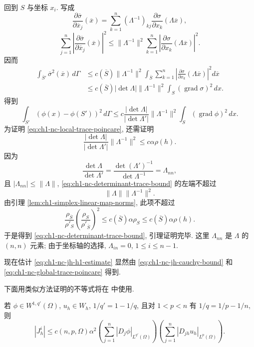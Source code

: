 \begin{Proof}
回到 $S$ 与坐标 $x_i$. 写成
\[
\frac{\partial\overline\sigma}{\partial\overline x_j}(\overline x)
=\sum_{k=1}^n(\Lambda^{-1})_{kj}
\frac{\partial\sigma}{\partial x_k}(\Lambda\overline x),
\]
\[
\sum_{j=1}^n\left|\frac{\partial\overline\sigma}{\partial\overline x_j}(\overline x)\right|^2
\leq\|\Lambda^{-1}\|^2\sum_{k=1}^n
\left|\frac{\partial\sigma}{\partial x_k}(\Lambda\overline x)\right|^2.
\]
因而
\[
\begin{aligned}
\int_{\overline S'}\overline\sigma^2(\overline x)\,d\Gamma
&\leq c(\overline S)\|\Lambda^{-1}\|^2
\int_{\overline S}\sum_{k=1}^n
\left|\frac{\partial\sigma}{\partial x_k}(\Lambda\overline x)\right|^2d\overline x\\
&\leq c(\overline S)|\det\Lambda|\|\Lambda^{-1}\|^2
\int_S(\operatorname{grad}\sigma)^2\,dx.
\end{aligned}
\]
得到
\[
\int_{S'}(\phi(x)-\phi(S'))^2\,d\Gamma
\leq c\frac{|\det\Lambda|}{|\det\Lambda'|}
\|\Lambda^{-1}\|^2\int_S(\operatorname{grad}\phi)^2\,dx.
\]
为证明 \eqref{eq:ch1-nc-local-trace-poincare}, 还需证明
\begin{equation}
\frac{|\det\Lambda|}{|\det\Lambda'|}
\|\Lambda^{-1}\|^2\leq c\alpha\rho(h).
\label{eq:ch1-nc-determinant-trace-bound}
\end{equation}
因为
\[
\frac{\det\Lambda}{\det\Lambda'}
=\frac{\det(\Lambda')^{-1}}{\det\Lambda^{-1}}
=\Lambda_{nn},
\]
且 $|\Lambda_{nn}|\leq\|\Lambda\|$, \eqref{eq:ch1-nc-determinant-trace-bound} 的左端不超过
\[
\|\Lambda\|\|\Lambda^{-1}\|^2.
\]
由引理 \ref{lem:ch1-simplex-linear-map-norms}, 此项不超过
\[
\frac{\rho_{\overline S}}{\rho'_S}
\left(\frac{\rho_S}{\rho'_{\overline S}}\right)^2
\leq c(\overline S)\alpha\rho_S
\leq c(\overline S)\alpha\rho(h).
\]
于是得到 \eqref{eq:ch1-nc-determinant-trace-bound}, 引理证明完毕. 这里 $\Lambda_{nn}$ 是 $\Lambda$ 的 $(n,n)$ 元素; 由于坐标轴的选择, $\Lambda_{in}=0$, $1\leq i\leq n-1$.
\end{Proof}

现在估计 \eqref{eq:ch1-nc-jh-h1-estimate} 显然由 \eqref{eq:ch1-nc-jh-cauchy-bound} 和 \eqref{eq:ch1-nc-global-trace-poincare} 得到.

下面用类似方法证明的不等式将在  中使用.

\begin{Proposition}
\label{prop:ch1-nc-jh-lp-estimate}
若 $\phi\in W^{1,q'}(\Omega)$, $u_h\in W_h$, $1/q'=1-1/q$, 且对 $1<p<n$ 有 $1/q=1/p-1/n$, 则
\begin{equation}
|J_h^i|\leq c(n,p,\Omega)\alpha^2
\left(\sum_{j=1}^n|D_j\phi|_{L^{q'}(\Omega)}\right)
\left(\sum_{j=1}^n|D_{jh}u_h|_{L^p(\Omega)}\right).
\label{eq:ch1-nc-jh-lp-estimate}
\end{equation}
\end{Proposition}


